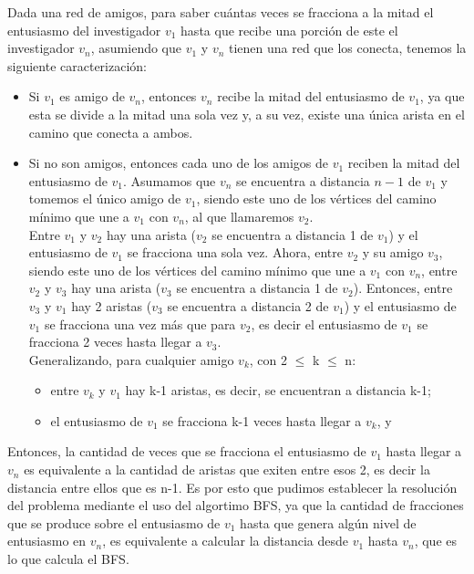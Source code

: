 \indent Dada una red de amigos, para saber cuántas veces se fracciona a la mitad
el entusiasmo del investigador $v_1$ hasta que recibe una porción de este el
investigador $v_n$, asumiendo que $v_1$ y $v_n$ tienen una red que los conecta,
tenemos la siguiente caracterización:
\begin{itemize}
 \item Si $v_1$ es amigo de $v_n$, entonces $v_n$ recibe la mitad del entusiasmo
de $v_1$, 
 ya que esta se divide a la mitad una sola vez y, a su vez, existe una única
arista en el camino que conecta a ambos.
 \item Si no son amigos, entonces cada uno de los amigos de $v_1$ reciben la
mitad del entusiasmo de $v_1$. Asumamos que $v_n$ se encuentra a distancia $n-1$
de $v_1$ y tomemos el único amigo de $v_1$, siendo este uno de los vértices del
camino mínimo que une a $v_1$ con $v_n$, al que llamaremos $v_2$. \\ 
\indent\indent Entre $v_1$ y $v_2$ hay una arista ($v_2$ se encuentra a
distancia 1 de $v_1$) y el entusiasmo de $v_1$ se fracciona una sola vez. Ahora,
entre $v_2$ y su amigo $v_3$, siendo este uno de los vértices del camino mínimo
que une a $v_1$ con $v_n$, entre $v_2$ y $v_3$ hay una arista ($v_3$ se
encuentra a distancia 1 de $v_2$). Entonces, entre $v_3$ y $v_1$ hay 2 aristas
($v_3$ se encuentra a distancia 2 de $v_1$) y el entusiasmo de $v_1$ se
fracciona una vez más que para $v_2$, es decir el entusiasmo de $v_1$ se
fracciona 2 veces hasta llegar a $v_3$. \\
\indent\indent Generalizando, para cualquier amigo $v_k$, con 2 $\leq$ k $\leq$
n:
 \begin{itemize}
  \item entre $v_k$ y $v_1$ hay k-1 aristas, es decir, se encuentran a distancia
k-1;
  \item el entusiasmo de $v_1$ se fracciona k-1 veces hasta llegar a $v_k$, y 
 \end{itemize}
\end{itemize}
\indent\indent Entonces, la cantidad de veces que se fracciona el entusiasmo de
$v_1$ hasta llegar a $v_n$ 
 es equivalente a la cantidad de aristas que exiten entre esos 2, es decir la
distancia entre ellos que es n-1.
 Es por esto que pudimos establecer la resolución del problema mediante
el uso del algortimo BFS, ya que la cantidad de fracciones que se produce sobre
el entusiasmo de $v_1$ hasta que genera algún nivel de entusiasmo en $v_n$, es
equivalente a calcular la distancia desde $v_1$ hasta $v_n$, que es lo que
calcula el BFS.\\


